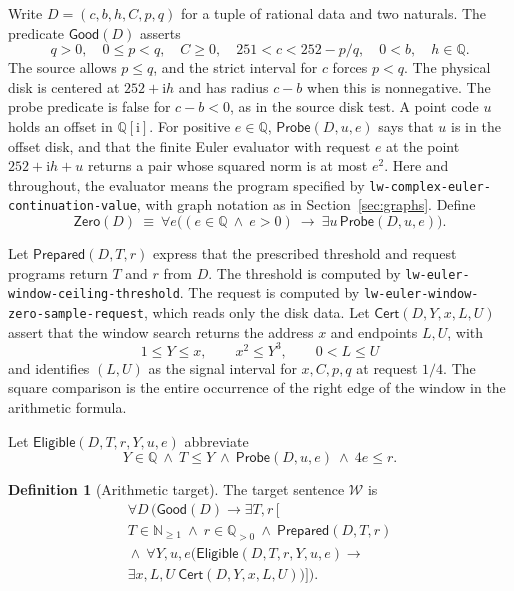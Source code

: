 \documentclass[11pt]{amsart}
\theoremstyle{definition}
\newtheorem{definition}[theorem]{Definition}
\theoremstyle{remark}
\numberwithin{equation}{section}
\newcommand{\N}{\mathbb N}
\newcommand{\Q}{\mathbb Q}
\newcommand{\QQi}{\mathbb Q[\mathrm i]}
\newcommand{\Probe}{\mathsf{Probe}}
\newcommand{\Zero}{\mathsf{Zero}}
\newcommand{\Good}{\mathsf{Good}}
\newcommand{\Cert}{\mathsf{Cert}}
\newcommand{\code}[1]{\nolinkurl{#1}}
\begin{document}
Write $D=(c,b,h,C,p,q)$ for a tuple of rational data and two naturals.
The predicate $\Good(D)$ asserts
\[
 q>0,\quad 0\le p<q,\quad C\ge 0,\quad
 251<c<252-p/q,\quad 0<b,\quad h\in\Q .
\]
The source allows \(p\le q\), and the strict interval
for \(c\) forces \(p<q\).
The physical disk is centered at $252+\mathrm i h$ and has radius
$c-b$ when this is nonnegative. The probe predicate is false for
$c-b<0$, as in the source disk test.
A point code $u$ holds an offset in $\QQi$. For positive $e\in\Q$,
$\Probe(D,u,e)$ says that $u$ is in the offset disk, and that the
finite Euler evaluator with request $e$ at the point
$252+\mathrm i h+u$ returns a pair whose squared norm is at most $e^2$.
Here and throughout, the evaluator means the program specified by
\code{lw-complex-euler-continuation-value}, with graph notation as in
Section~\ref{sec:graphs}. Define
\[
 \Zero(D) \ \equiv\
 \forall e\bigl((e\in\Q\ \wedge\ e>0)\ \longrightarrow\
                  \exists u\,\Probe(D,u,e)\bigr).
\]

Let $\mathsf{Prepared}(D,T,r)$ express that the prescribed threshold and
request programs return $T$ and $r$ from $D$. The threshold is computed
by \code{lw-euler-window-ceiling-threshold}. The request is computed by
\code{lw-euler-window-zero-sample-request}, which reads only the disk
data. Let $\Cert(D,Y,x,L,U)$ assert that the window search returns the
address $x$ and endpoints $L,U$, with
\[
 1\le Y\le x,\qquad x^2\le Y^3,\qquad 0<L\le U
\]
and identifies $(L,U)$ as the signal interval for $x,C,p,q$ at
request $1/4$. The square comparison is the entire occurrence of the
right edge of the window in the arithmetic formula.

Let $\mathsf{Eligible}(D,T,r,Y,u,e)$ abbreviate
\[
  Y\in\Q\ \wedge\ T\le Y\ \wedge\ \Probe(D,u,e)\ \wedge\ 4e\le r.
\]

\begin{definition}[Arithmetic target]\label{def:target}
The target sentence $\mathcal W$ is
\begin{equation}\label{eq:target}
\begin{gathered}
\forall D\,\bigl(\Good(D)\longrightarrow\exists T,r\,[\\
 T\in\N_{\ge1} \ \wedge\ r\in\Q_{>0} \ \wedge\ \mathsf{Prepared}(D,T,r)\\
 {}\wedge\ \forall Y,u,e\bigl(\mathsf{Eligible}(D,T,r,Y,u,e)
       \longrightarrow\\
 \exists x,L,U\ \Cert(D,Y,x,L,U)\bigr)]\bigr).
\end{gathered}
\end{equation}
\end{definition}
\end{document}
